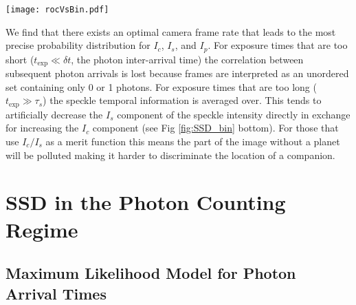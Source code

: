 \documentclass[../main.tex]{subfiles}
\begin{document}
\begin{figure*}
    \centering
    \texttt{[image: rocVsBin.pdf]}
\caption[ROC curve performance of the millisecond imaging SSD algorithm]{Performance of our millisecond imaging SSD algorithm (Section \ref{sec:binned}) compared to our photon counting SSD algorithm (Section \ref{sec:binfree}). Left panels: histograms of the maximum likelihood estimates of $I_p$, computed using $3\cdot 10^5$ 30~s mock photon lists. Maximum likelihood estimates for $I_p$ are calculated for various effective exposure times and for the case with (solid line) and without ($I_p=0$, dashed line) an injected planet. The $y$-axis in the left column is arbitrary. The probability distributions are used to calculate the true/false positive rates for the receiver operator characteristic (ROC) curve (right). The vertical dotted line at 1/20000 (for the 20000 pixels in MEC) roughly indicates the maximum tolerable false positive rate. The full photon-counting SSD algorithm (blue lines) described in Section \ref{sec:binfree} outperforms the cases with nonzero exposure times.}
    \label{fig:rocVsBin}
\end{figure*}

We find that there exists an optimal camera frame rate that leads to the most precise probability distribution for $I_c$, $I_s$, and $I_p$. For exposure times that are too short ($t_\mathrm{exp} \ll \delta t$, the photon inter-arrival time) the correlation between subsequent photon arrivals is lost because frames are interpreted as an unordered set containing only 0 or 1 photons. For exposure times that are too long ($t_\mathrm{exp} \gg \tau_s$) the speckle temporal information is averaged over. This tends to artificially decrease the $I_s$ component of the speckle intensity directly in exchange for increasing the $I_c$ component (see Fig \ref{fig:SSD_bin} bottom). For those that use $I_c / I_s$ as a merit function this means the part of the image without a planet will be polluted making it harder to discriminate the location of a companion.





\section{SSD in the Photon Counting Regime} \label{sec:binfree}

\subsection{Maximum Likelihood Model for Photon Arrival Times}
\end{document}
